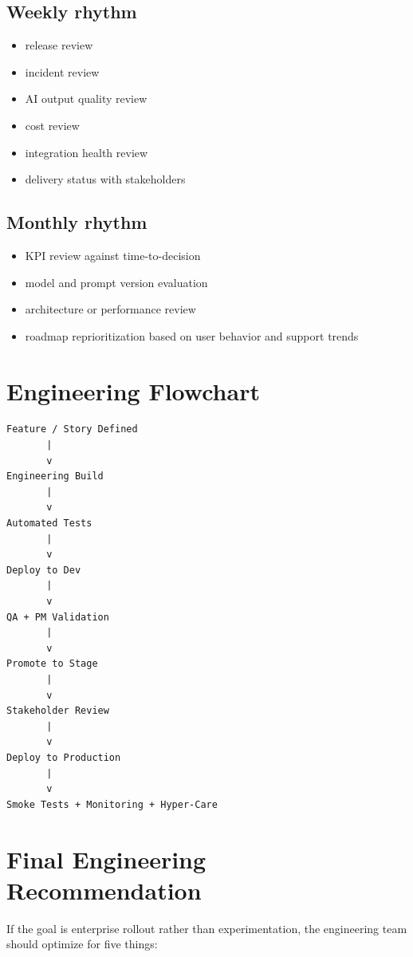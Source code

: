 \documentclass[11pt]{article}
\begin{document}
\subsection{Weekly rhythm}

\begin{itemize}
\item release review
\item incident review
\item AI output quality review
\item cost review
\item integration health review
\item delivery status with stakeholders
\end{itemize}

\subsection{Monthly rhythm}

\begin{itemize}
\item KPI review against time-to-decision
\item model and prompt version evaluation
\item architecture or performance review
\item roadmap reprioritization based on user behavior and support trends
\end{itemize}

\section{Engineering Flowchart}

\begin{verbatim}
Feature / Story Defined
       |
       v
Engineering Build
       |
       v
Automated Tests
       |
       v
Deploy to Dev
       |
       v
QA + PM Validation
       |
       v
Promote to Stage
       |
       v
Stakeholder Review
       |
       v
Deploy to Production
       |
       v
Smoke Tests + Monitoring + Hyper-Care
\end{verbatim}

\section{Final Engineering Recommendation}

If the goal is enterprise rollout rather than experimentation, the engineering team should optimize for five things:
\end{document}
